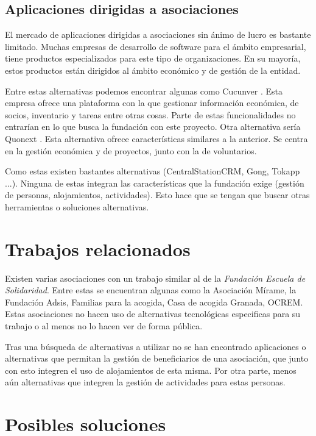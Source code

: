 \subsection{Aplicaciones dirigidas a asociaciones}

El mercado de aplicaciones dirigidas a asociaciones sin ánimo de lucro es bastante limitado. Muchas empresas de desarrollo de software para el ámbito empresarial, tiene productos especializados para este tipo de organizaciones. En su mayoría, estos productos están dirigidos al ámbito económico y de gestión de la entidad. 

Entre estas alternativas podemos encontrar algunas como Cucunver \cite{cucunver}. Esta empresa ofrece una plataforma con la que gestionar información económica, de socios, inventario y tareas entre otras cosas. Parte de estas funcionalidades no entrarían en lo que busca la fundación con este proyecto. Otra alternativa sería Quonext \cite{quonext}. Esta alternativa ofrece características similares a la anterior. Se centra en la gestión económica y de proyectos, junto con la de voluntarios.

Como estas existen bastantes alternativas (CentralStationCRM, Gong, Tokapp ...). Ninguna de estas integran las características que la fundación exige (gestión de personas, alojamientos, actividades). Esto hace que se tengan que buscar otras herramientas o soluciones alternativas. 

\section{Trabajos relacionados}

Existen varias asociaciones con un trabajo similar al de la \textit{Fundación Escuela de Solidaridad}. Entre estas se encuentran algunas como la Asociación Mírame, la Fundación Adsis, Familias para la acogida, Casa de acogida Granada, OCREM. Estas asociaciones no hacen uso de alternativas tecnológicas especificas para su trabajo o al menos no lo hacen ver de forma pública. 

Tras una búsqueda de alternativas a utilizar no se han encontrado aplicaciones o alternativas que permitan la gestión de beneficiarios de una asociación, que junto con esto integren el uso de alojamientos de esta misma. Por otra parte, menos aún alternativas que integren la gestión de actividades para estas personas.

\section{Posibles soluciones}

